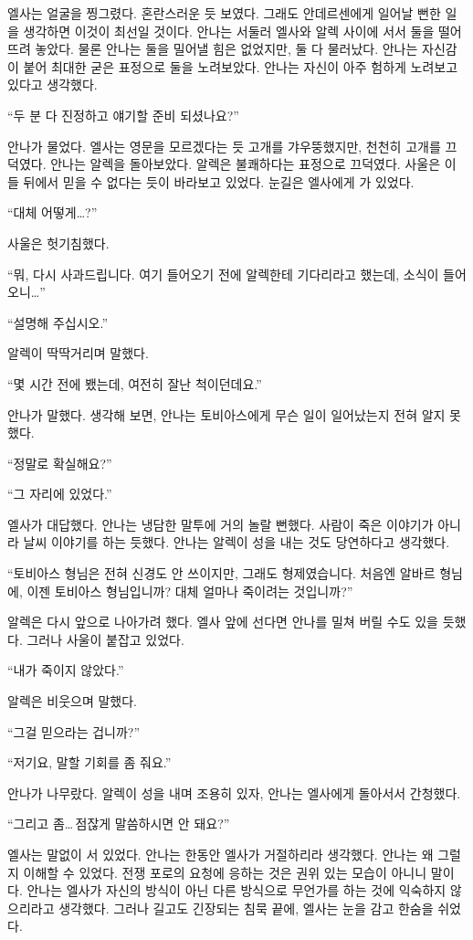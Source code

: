 엘사는 얼굴을 찡그렸다. 혼란스러운 듯 보였다. 그래도 안데르센에게 일어날 뻔한 일을 생각하면 이것이 최선일 것이다. 안나는 서둘러 엘사와 알렉 사이에 서서 둘을 떨어뜨려 놓았다. 물론 안나는 둘을 밀어낼 힘은 없었지만, 둘 다 물러났다. 안나는 자신감이 붙어 최대한 굳은 표정으로 둘을 노려보았다. 안나는 자신이 아주 험하게 노려보고 있다고 생각했다.

``두 분 다 진정하고 얘기할 준비 되셨나요?''

안나가 물었다. 엘사는 영문을 모르겠다는 듯 고개를 갸우뚱했지만, 천천히 고개를 끄덕였다. 안나는 알렉을 돌아보았다. 알렉은 불쾌하다는 표정으로 끄덕였다. 사울은 이들 뒤에서 믿을 수 없다는 듯이 바라보고 있었다. 눈길은 엘사에게 가 있었다.

``대체 어떻게\ldots?''

사울은 헛기침했다.

``뭐, 다시 사과드립니다. 여기 들어오기 전에 알렉한테 기다리라고 했는데, 소식이 들어오니\ldots''

``설명해 주십시오.''

알렉이 딱딱거리며 말했다.

``몇 시간 전에 뵀는데, 여전히 잘난 척이던데요.''

안나가 말했다. 생각해 보면, 안나는 토비아스에게 무슨 일이 일어났는지 전혀 알지 못했다.

``정말로 확실해요?''

``그 자리에 있었다.''

엘사가 대답했다. 안나는 냉담한 말투에 거의 놀랄 뻔했다. 사람이 죽은 이야기가 아니라 날씨 이야기를 하는 듯했다. 안나는 알렉이 성을 내는 것도 당연하다고 생각했다.

``토비아스 형님은 전혀 신경도 안 쓰이지만, 그래도 형제였습니다. 처음엔 알바르 형님에, 이젠 토비아스 형님입니까? 대체 얼마나 죽이려는 것입니까?''

알렉은 다시 앞으로 나아가려 했다. 엘사 앞에 선다면 안나를 밀쳐 버릴 수도 있을 듯했다. 그러나 사울이 붙잡고 있었다.

``내가 죽이지 않았다.''

알렉은 비웃으며 말했다.

``그걸 믿으라는 겁니까?''

``저기요, 말할 기회를 좀 줘요.''

안나가 나무랐다. 알렉이 성을 내며 조용히 있자, 안나는 엘사에게 돌아서서 간청했다.

``그리고 좀\ldots\,점잖게 말씀하시면 안 돼요?''

엘사는 말없이 서 있었다. 안나는 한동안 엘사가 거절하리라 생각했다. 안나는 왜 그럴지 이해할 수 있었다. 전쟁 포로의 요청에 응하는 것은 권위 있는 모습이 아니니 말이다. 안나는 엘사가 자신의 방식이 아닌 다른 방식으로 무언가를 하는 것에 익숙하지 않으리라고 생각했다. 그러나 길고도 긴장되는 침묵 끝에, 엘사는 눈을 감고 한숨을 쉬었다.


